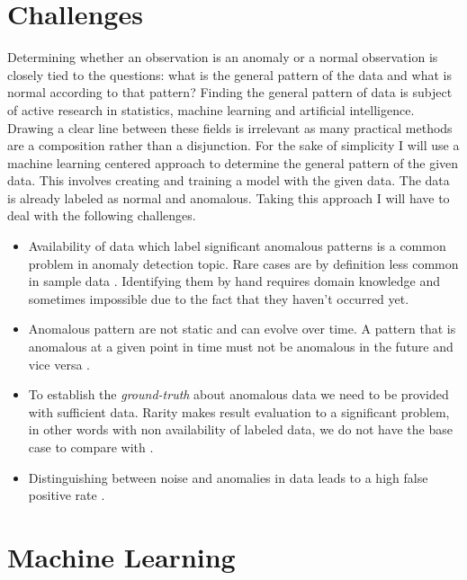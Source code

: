 \section{Challenges}
Determining whether an observation is an anomaly or a normal observation is closely tied to the questions: what is the general pattern of the data and what is normal according to that pattern? Finding the general pattern of data is subject of active research in statistics, machine learning and artificial intelligence. Drawing a clear line between these fields is irrelevant as many practical methods are a composition rather than a disjunction. For the sake of simplicity I will use a machine learning centered approach to determine the general pattern of the given data. This involves creating and training a model with the given data. The data is already labeled as normal and anomalous. Taking this approach I will have to deal with the following challenges.


\begin{itemize}
    \item Availability of data which label significant anomalous patterns is a common problem in anomaly detection topic. Rare cases are by definition less common in sample data \cite{Weiss:2004:MRU:1007730.1007734}. Identifying them by hand requires domain knowledge and sometimes impossible due to the fact that they haven't occurred yet.
    
    \item Anomalous pattern are not static and can evolve over time. A pattern that is anomalous at a given point in time must not be anomalous in the future and vice versa \cite{Chandola:2009:ADS:1541880.1541882}.
    
    \item To establish the \textit{ground-truth} about anomalous data we need to be provided with sufficient data. Rarity makes result evaluation to a significant problem, in other words with non availability of labeled data, we do not have the base case to compare with \cite{Aggarwal:2013}. %
    
    \item Distinguishing between noise and anomalies in data leads to a high false positive rate \cite{Chandola:2009:ADS:1541880.1541882}.  %
\end{itemize}

\section{Machine Learning} 

